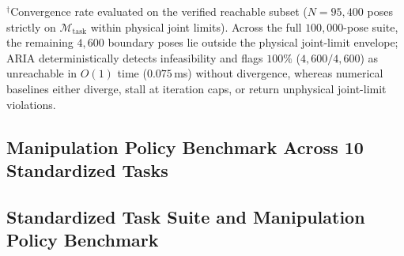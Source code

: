 \documentclass[journal]{IEEEtran}
\begin{document}
\begin{table}[!t]
\centering
\caption{Kinematic Solver Performance Benchmark Across $100{,}000$ Stratified Target Poses}
\label{table_ik_benchmark}
\footnotesize
{}
\end{table}
\noindent\footnotesize{$^\dagger$Convergence rate evaluated on the verified reachable subset ($N=95{,}400$ poses strictly on $\mathcal{M}_{\text{task}}$ within physical joint limits). Across the full $100{,}000$-pose suite, the remaining $4{,}600$ boundary poses lie outside the physical joint-limit envelope; ARIA deterministically detects infeasibility and flags $100\%$ ($4{,}600/4{,}600$) as unreachable in $O(1)$ time ($0.075$\,ms) without divergence, whereas numerical baselines either diverge, stall at iteration caps, or return unphysical joint-limit violations.}

\subsection{Manipulation Policy Benchmark Across 10 Standardized Tasks}

\subsection{Standardized Task Suite and Manipulation Policy Benchmark}
\label{sec_manipulation_benchmark}
\end{document}
